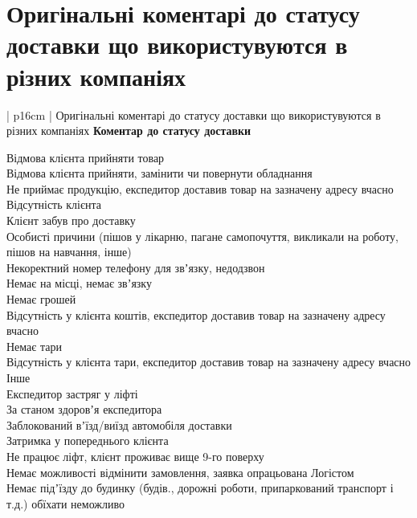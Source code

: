 \chapter{Оригінальні коментарі до статусу доставки що використувуются в різних компаніях} \label{AppendixA}

\begin{mytable*}{ | p{16cm} | }%
	{Оригінальні коментарі до статусу доставки що використувуются в різних компаніях}%
	{\label{tbl:original_comments}}%
	{\textbf{Коментар до статусу доставки}}
	
	Відмова клієнта прийняти товар \\
	\nopagebreak\quad Відмова клієнта прийняти, замінити чи повернути обладнання \\
	\nopagebreak\quad Не приймає продукцію, експедитор доставив товар на зазначену адресу вчасно \\
	\hline
	Відсутність клієнта \\
	\nopagebreak\quad Клієнт забув про доставку \\
	\nopagebreak\quad Особисті причини (пішов у лікарню, пагане самопочуття, викликали на роботу, пішов на навчання, інше) \\
	\nopagebreak\quad Некоректний номер телефону для звʼязку, недодзвон \\
	\nopagebreak\quad Немає на місці, немає звʼязку \\
	\hline
	Немає грошей \\
	\nopagebreak\quad Відсутність у клієнта коштів, експедитор доставив товар на зазначену адресу вчасно \\
	\hline
	Немає тари \\
	\nopagebreak\quad Відсутність у клієнта тари, експедитор доставив товар на зазначену адресу вчасно \\
	\hline
	Інше \\
	\nopagebreak\quad Експедитор застряг у ліфті \\
	\nopagebreak\quad За станом здоровʼя експедитора \\
	\nopagebreak\quad Заблокований вʼїзд/виїзд автомобіля доставки \\
	\nopagebreak\quad Затримка у попереднього клієнта \\
	\nopagebreak\quad Не працює ліфт, клієнт проживає вище 9-го поверху \\
	\nopagebreak\quad Немає можливості  відмінити замовлення, заявка опрацьована Логістом \\
	\nopagebreak\quad Немає підʼїзду до будинку (будів., дорожні роботи, припаркований транспорт і т.д.) обїхати неможливо \\

\end{mytable*}
